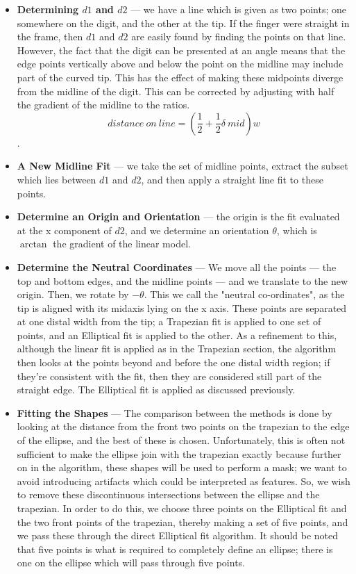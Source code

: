 \begin{itemize}
\item \textbf{Determining $d1$ and $d2$} --- we have a line which is given as two points; one somewhere on the digit, and the other at the tip. If the finger were straight in the frame, then $d1$ and $d2$ are easily found by finding the points on that line. However, the fact that the digit can be presented at an angle means that the edge points vertically above and below the point on the midline may include part of the curved tip. This has the effect of making these midpoints diverge from the midline of the digit. This can be corrected by adjusting with half the gradient of the midline to the ratios. \begin{equation}distance \:on \:line = (\frac{1}{2} + \frac{1}{2}\delta\:mid)w\end{equation}.

\item \textbf{A New Midline Fit} --- we take the set of midline points, extract the subset which lies between $d1$ and $d2$, and then apply a straight line fit to these points.

\item \textbf{Determine an Origin and Orientation} --- the origin is the fit evaluated at the x component of $d2$, and we determine an orientation $\theta$, which is $\arctan$ the gradient of the linear model.

\item \textbf{Determine the Neutral Coordinates} --- We move all the points --- the top and bottom edges, and the midline points --- and we translate to the new origin. Then, we rotate by $-\theta$. This we call the "neutral co-ordinates", as the tip is aligned with its midaxis lying on the x axis. These points are separated at one distal width from the tip; a Trapezian fit is applied to one set of points, and an Elliptical fit is applied to the other. As a refinement to this, although the linear fit is applied as in the Trapezian section, the algorithm then looks at the points beyond and before the one distal width region; if they're consistent with the fit, then they are considered still part of the straight edge. The Elliptical fit is applied as discussed previously. 

\item \textbf{Fitting the Shapes} --- The comparison between the methods is done by looking at the distance from the front two points on the trapezian to the edge of the ellipse, and the best of these is chosen. Unfortunately, this is often not sufficient to make the ellipse join with the trapezian exactly because further on in the algorithm, these shapes will be used to perform a mask; we want to avoid introducing artifacts which could be interpreted as features. So, we wish to remove these discontinuous intersections between the ellipse and the trapezian. In order to do this, we choose three points on the Elliptical fit and the two front points of the trapezian, thereby making a set of five points, and we pass these through the direct Elliptical fit algorithm. It should be noted that five points is what is required to completely define an ellipse; there is one on the ellipse which will pass through five points.


\end{itemize}
